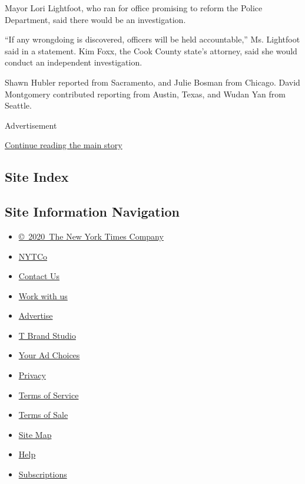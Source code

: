Mayor Lori Lightfoot, who ran for office promising to reform the Police
Department, said there would be an investigation.

``If any wrongdoing is discovered, officers will be held accountable,''
Ms. Lightfoot said in a statement. Kim Foxx, the Cook County state's
attorney, said she would conduct an independent investigation.

Shawn Hubler reported from Sacramento, and Julie Bosman from Chicago.
David Montgomery contributed reporting from Austin, Texas, and Wudan Yan
from Seattle.

Advertisement

\protect\hyperlink{after-bottom}{Continue reading the main story}

\hypertarget{site-index}{%
\subsection{Site Index}\label{site-index}}

\hypertarget{site-information-navigation}{%
\subsection{Site Information
Navigation}\label{site-information-navigation}}

\begin{itemize}
\tightlist
\item
  \href{https://help.nytimes.com/hc/en-us/articles/115014792127-Copyright-notice}{©~2020~The
  New York Times Company}
\end{itemize}

\begin{itemize}
\tightlist
\item
  \href{https://www.nytco.com/}{NYTCo}
\item
  \href{https://help.nytimes.com/hc/en-us/articles/115015385887-Contact-Us}{Contact
  Us}
\item
  \href{https://www.nytco.com/careers/}{Work with us}
\item
  \href{https://nytmediakit.com/}{Advertise}
\item
  \href{http://www.tbrandstudio.com/}{T Brand Studio}
\item
  \href{https://www.nytimes.com/privacy/cookie-policy\#how-do-i-manage-trackers}{Your
  Ad Choices}
\item
  \href{https://www.nytimes.com/privacy}{Privacy}
\item
  \href{https://help.nytimes.com/hc/en-us/articles/115014893428-Terms-of-service}{Terms
  of Service}
\item
  \href{https://help.nytimes.com/hc/en-us/articles/115014893968-Terms-of-sale}{Terms
  of Sale}
\item
  \href{https://spiderbites.nytimes.com}{Site Map}
\item
  \href{https://help.nytimes.com/hc/en-us}{Help}
\item
  \href{https://www.nytimes.com/subscription?campaignId=37WXW}{Subscriptions}
\end{itemize}
